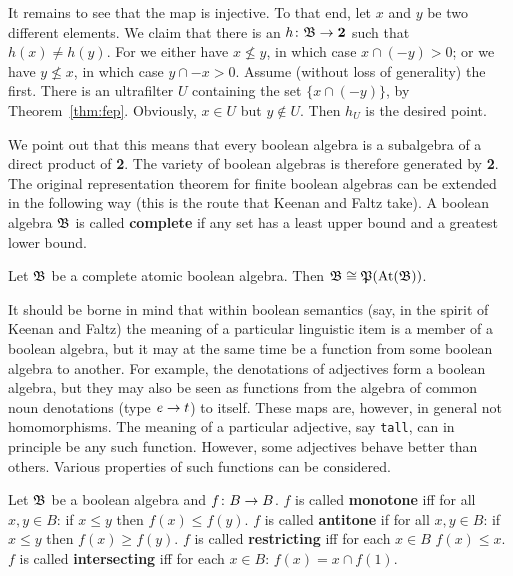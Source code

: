 \proofbeg
It remains to see that the map is injective. To that end,
let $x$ and $y$ be two different elements. We claim that there
is an $h \colon \mathfrak{B} \rightarrow \mathbf{2}$ such that $h(x) \neq h(y)$. For
we either have $x \nleq y$, in which case $x \cap (-y) > 0$;
or we have $y \nleq x$, in which case $y \cap -x > 0$. Assume
(without loss of generality) the first. There is an ultrafilter 
$U$ containing the set $\{x \cap (-y)\}$, by Theorem~\ref{thm:fep}.
Obviously, $x \in U$ but $y \not\in U$. Then $h_U$ is the desired
point.
\proofend

We point out that this means that every boolean algebra is a 
subalgebra of a direct product of \textbf{2}. The variety of 
boolean algebras is therefore generated by \textbf{2}.
The original representation theorem for finite boolean algebras
can be extended in the following way (this is the route that
Keenan and Faltz take). A boolean algebra $\mathfrak{B}$ is called 
\textbf{complete} 
if any set has a least upper bound and a greatest lower bound.
\begin{thm}
Let $\mathfrak{B}$ be a complete atomic boolean algebra. Then $\mathfrak{B} \cong
\mathfrak{P}(\operatorname{At}(\mathfrak{B}))$.
\end{thm}
It should be borne in mind that within boolean semantics (say,
in the spirit of Keenan and Faltz) 
the meaning of a particular
linguistic item is a member of a boolean algebra, but it may at
the same time be a function from some boolean algebra to another.
For example, the denotations of adjectives form a boolean 
algebra, but they may also be seen as functions from the algebra 
of common noun denotations (type $e \rightarrow t$) to itself. These maps 
are, however, in general not homomorphisms. The meaning of a 
particular adjective, say {\tt tall}, can in principle be any such 
function. However, some adjectives behave better than others.  
Various properties of such functions can be considered.
\begin{defn}
Let $\mathfrak{B}$ be a boolean algebra and $f \colon B \rightarrow B$.
$f$ is called \textbf{monotone} iff for all $x, y \in B$:
if $x \leq y$ then $f(x) \leq f(y)$. $f$ is called \textbf{antitone}
if for all $x, y \in B$: if $x \leq y$ then $f(x) \geq f(y)$.
$f$ is called \textbf{restricting} iff for each
$x \in B$ $f(x) \leq x$. $f$ is called \textbf{intersecting} iff
for each $x \in B$: $f(x) = x \cap f(1)$.
\end{defn}
